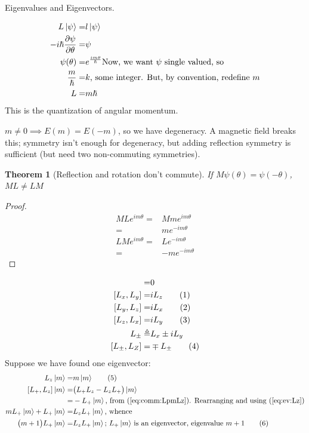 \documentclass[]{article}
\newcommand\numberthis{\addtocounter{equation}{1}\tag{\theequation}}
\newtheorem{thm}{Theorem}
\begin{document}
Eigenvalues and Eigenvectors.

\begin{align*}
L\ket{\psi} =& l \ket{\psi}\\
-i \hslash \frac{\partial \psi}{\partial \theta} =& \psi\\
\psi(\theta) =& e^{\frac{i m \theta}{\hslash}}\text{Now, we want $\psi$ single valued, so}\\
\frac{m}{\hslash}=&k\text{, some integer. But, by convention, redefine $m$}\\
L=& m \hslash
\end{align*}
This is the quantization of angular momentum.

$m\ne 0 \implies E(m)=E(-m)$, so we have degeneracy. A magnetic field breaks this; symmetry isn't enough for degeneracy, but adding reflection symmetry is sufficient (but need two non-commuting symmetries).

\begin{thm}[Reflection and rotation don't commute]
	If $M\psi(\theta) = \psi(-\theta)$, $ML \ne LM$
\end{thm}
\begin{proof}
	\begin{align*}
	MLe^{i m \theta} =& M m e^{i m \theta}\\
	=&m e^{- i m \theta}\\
	LMe^{i m \theta} =& L e^{- i m \theta}\\
	=& -m e^{- i m \theta}
	\end{align*}
\end{proof}

\begin{align*}
[L,H]=& 0\\
[L_x,L_y] =& i L_z \numberthis \label{eq:lx_ly}\\
[L_y,L_z] =& i L_x\numberthis \label{eq:ly_lz}\\
[L_z,L_x] =& i L_y\numberthis \label{eq:lz_lx}\\
L_{\pm} \triangleq& L_x \pm i L_y\\
[L_{\pm},L_Z] =& \mp L_{\pm} \numberthis \label{eq:comm:LpmLz}
\end{align*}
Suppose we have found one eigenvector:
\begin{align*}
L_z \ket{m} =& m \ket{m} \numberthis \label{eq:ev:Lz}\\
[L_+,L_z] \ket{m} =& \big(L_+L_z - L_zL_+\big) \ket{m}\\
=&- L_+ \ket{m} \text{, from (\ref{eq:comm:LpmLz}). Rearranging  and using (\ref{eq:ev:Lz})}\\
 m L_+\ket{m} + L_+\ket{m} =& L_z L_+ \ket{m} \text{, whence}\\
 \big(m + 1 \big)L_+\ket{m}  =& L_z L_+ \ket{m} \text{; $L_+ \ket{m}$ is an eigenvector, eigenvalue $m+1$}\numberthis \label{eq:create_m}
\end{align*}
\end{document}
